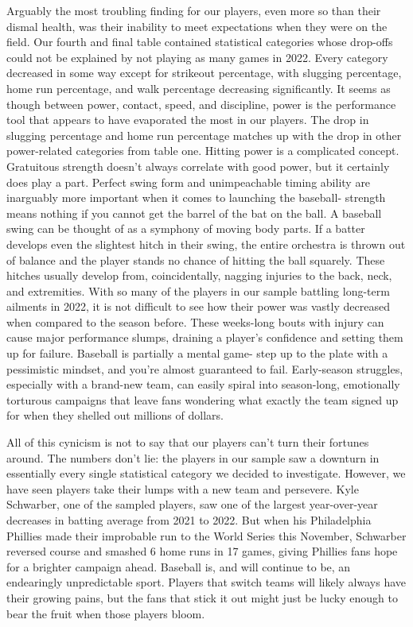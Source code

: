 \documentclass[10pt]{article}
\begin{document}
Arguably the most troubling finding for our players, even more so than their dismal health, was their inability to meet 
expectations when they were on the field. Our fourth and final table contained statistical categories whose drop-offs could 
not be explained by not playing as many games in 2022. Every category decreased in some way except for strikeout percentage, 
with slugging percentage, home run percentage, and walk percentage decreasing significantly. It seems as though between power, 
contact, speed, and discipline, power is the performance tool that appears to have evaporated the most in our players. The drop 
in slugging percentage and home run percentage matches up with the drop in other power-related categories from table one. 
Hitting power is a complicated concept. Gratuitous strength doesn’t always correlate with good power, but it certainly does 
play a part. Perfect swing form and unimpeachable timing ability are inarguably more important when it comes to launching the 
baseball- strength means nothing if you cannot get the barrel of the bat on the ball. A baseball swing can be thought of as a 
symphony of moving body parts. If a batter develops even the slightest hitch in their swing, the entire orchestra is thrown out 
of balance and the player stands no chance of hitting the ball squarely. These hitches usually develop from, coincidentally, 
nagging injuries to the back, neck, and extremities. With so many of the players in our sample battling long-term ailments in 
2022, it is not difficult to see how their power was vastly decreased when compared to the season before. These weeks-long 
bouts with injury can cause major performance slumps, draining a player’s confidence and setting them up for failure. Baseball 
is partially a mental game- step up to the plate with a pessimistic mindset, and you’re almost guaranteed to fail. Early-season 
struggles, especially with a brand-new team, can easily spiral into season-long, emotionally torturous campaigns that leave 
fans wondering what exactly the team signed up for when they shelled out millions of dollars.

All of this cynicism is not to say that our players can’t turn their fortunes around. The numbers don’t lie: the players in 
our sample saw a downturn in essentially every single statistical category we decided to investigate. However, we have seen 
players take their lumps with a new team and persevere. Kyle Schwarber, one of the sampled players, saw one of the largest 
year-over-year decreases in batting average from 2021 to 2022. But when his Philadelphia Phillies made their improbable run 
to the World Series this November, Schwarber reversed course and smashed 6 home runs in 17 games, giving Phillies fans hope for 
a brighter campaign ahead. Baseball is, and will continue to be, an endearingly unpredictable sport. Players that switch teams 
will likely always have their growing pains, but the fans that stick it out might just be lucky enough to bear the fruit when 
those players bloom.
\end{document}
